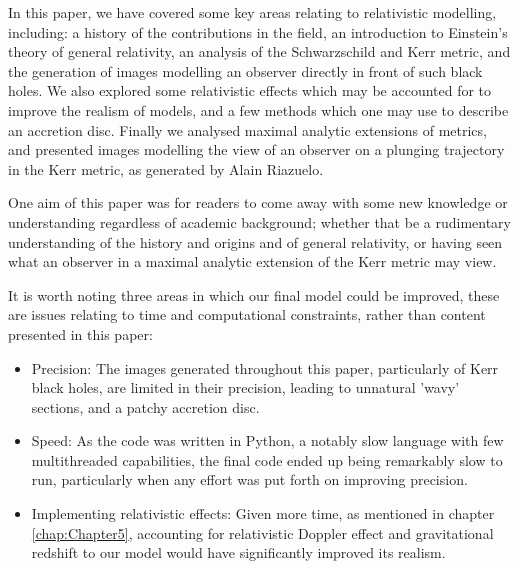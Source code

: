 \documentclass[oneside,openright,frontopenright, singlespacing]{dmathesis}
\begin{document}
\begin{conclusion}
	In this paper, we have covered some key areas relating to relativistic modelling, including: a history of the contributions in the field, an introduction to Einstein's theory of general relativity, an analysis of the Schwarzschild and Kerr metric, and the generation of images modelling an observer directly in front of such black holes. We also explored some relativistic effects which may be accounted for to improve the realism of models, and a few methods which one may use to describe an accretion disc. Finally we analysed maximal analytic extensions of metrics, and presented images modelling the view of an observer on a plunging trajectory in the Kerr metric, as generated by Alain Riazuelo\cite{seeingRelativity}.

\vspace{1em}
	One aim of this paper was for readers to come away with some new knowledge or understanding regardless of academic background; whether that be a rudimentary understanding of the history and origins and of general relativity, or having seen what an observer in a maximal analytic extension of the Kerr metric may view.

\vspace{1em}
	It is worth noting three areas in which our final model could be improved, these are issues relating to time and computational constraints, rather than content presented in this paper:

\begin{itemize}
	\item Precision: The images generated throughout this paper, particularly of Kerr black holes, are limited in their precision, leading to unnatural 'wavy' sections, and a patchy accretion disc.
	\item Speed: As the code was written in Python, a notably slow language with few multithreaded capabilities, the final code ended up being remarkably slow to run, particularly when any effort was put forth on improving precision.
	\item Implementing relativistic effects: Given more time, as mentioned in chapter \ref{chap:Chapter5}, accounting for relativistic Doppler effect and gravitational redshift to our model would have significantly improved its realism.
\end{itemize}


\end{conclusion}
\end{document}
